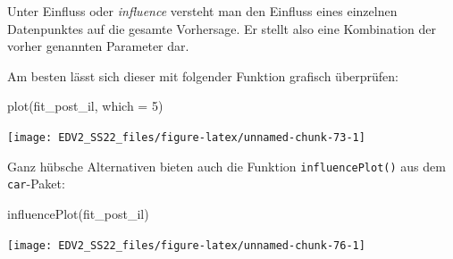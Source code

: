 \documentclass[
]{book}
\newenvironment{Shaded}{\begin{snugshade}}{\end{snugshade}}
\newcommand{\AttributeTok}[1]{\textcolor[rgb]{0.77,0.63,0.00}{#1}}
\newcommand{\DecValTok}[1]{\textcolor[rgb]{0.00,0.00,0.81}{#1}}
\newcommand{\FunctionTok}[1]{\textcolor[rgb]{0.00,0.00,0.00}{#1}}
\newcommand{\NormalTok}[1]{#1}
\begin{document}
Unter Einfluss oder \emph{influence} versteht man den Einfluss eines einzelnen Datenpunktes auf die gesamte Vorhersage. Er stellt also eine Kombination der vorher genannten Parameter dar.

Am besten lässt sich dieser mit folgender Funktion grafisch überprüfen:

\begin{Shaded}
\begin{Highlighting}[]
\FunctionTok{plot}\NormalTok{(fit\_post\_il, }\AttributeTok{which =} \DecValTok{5}\NormalTok{)}
\end{Highlighting}
\end{Shaded}

\begin{center}\texttt{[image: EDV2\_SS22\_files/figure-latex/unnamed-chunk-73-1]} \end{center}

Ganz hübsche Alternativen bieten auch die Funktion \texttt{influencePlot()} aus dem \texttt{car}-Paket:

\begin{Shaded}
\begin{Highlighting}[]
\FunctionTok{influencePlot}\NormalTok{(fit\_post\_il)}
\end{Highlighting}
\end{Shaded}

\begin{center}\texttt{[image: EDV2\_SS22\_files/figure-latex/unnamed-chunk-76-1]} \end{center}

 
  \providecommand{\huxb}[2]{\arrayrulecolor[RGB]{#1}\global\arrayrulewidth=#2pt}
  \providecommand{\huxvb}[2]{\color[RGB]{#1}\vrule width #2pt}
  \providecommand{\huxtpad}[1]{\rule{0pt}{#1}}
  \providecommand{\huxbpad}[1]{\rule[-#1]{0pt}{#1}}
\end{document}
